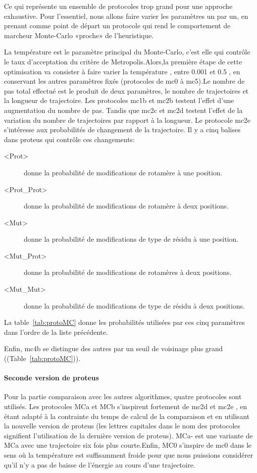 Ce qui représente un ensemble de protocoles trop grand pour une approche exhaustive. Pour l'essentiel, nous allons faire varier les paramètres un par un, en prenant comme point de départ un protocole qui rend le comportement de marcheur Monte-Carlo «proche» de l'heuristique.

La température est le paramètre principal du Monte-Carlo, c'est elle qui contrôle le taux d'acceptation du critère de Metropolis.Alors,la première étape de cette optimisation va consister à faire varier la température , entre 0.001 et 0.5 , en conservant les autres paramètres fixés (protocoles de mc0 à mc5).Le nombre de pas total effectué est le produit de deux paramètres, le nombre de trajectoires et la longueur de trajectoire. Les protocoles mc1b et mc2b testent l'effet d'une augmentation du nombre de pas. Tandis que mc2c et mc2d testent l'effet de la variation du nombre de trajectoires par rapport à la longueur.
Le protocole mc2e s'intéresse aux probabilités de changement de la trajectoire. Il y a cinq balises dans proteus qui contrôle ces changements:

\begin{description}
\item[<Prot>] donne la probabilité de modifications de  rotamère à une position.
\item[<Prot\_Prot>] donne la probabilité de modifications de  rotamère à deux positions.
\item[<Mut>] donne la probabilité de modifications de type de résidu à une position.
\item[<Mut\_Prot>] donne la probabilité de modifications de  rotamères à deux positions.
\item[<Mut\_Mut>] donne la probabilité de modifications de type de résidu à deux positions.
\end{description}

La table~\ref{tab:protoMC} donne les probabilités utilisées par ces cinq paramètres dans l'ordre de la liste précédente. 

Enfin, mc4b se distingue des autres par un seuil de voisinage plus grand ((Table~\ref{tab:protoMC})).

\paragraph{Seconde version de proteus}
Pour la partie comparaison avec les autres algorithmes, quatre protocoles sont utilisés. Les protocoles MCa et MCb s'inspirent fortement de mc2d et mc2e , en étant adapté à la contrainte du temps de calcul de la comparaison et en utilisant la nouvelle version de proteus (les lettres capitales dans le nom des protocoles signifient l'utilisation de la dernière version de proteus). MCa- est une variante de MCa avec une trajectoire six fois plus courte.Enfin, MC0 s'inspire de mc0 dans le sens où la température est suffisamment froide pour que nous puissions considérer qu'il n'y a pas de baisse de l'énergie au cours d'une trajectoire.
  

